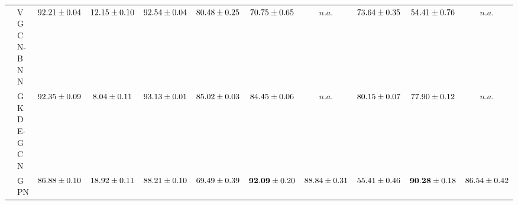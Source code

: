 \begin{table*}[!h]
{\begin{tabular}{ll|cc|cccc|ccc}
        & VGCN-BNN & ${92.21\tiny \pm 0.04}$ & ${12.15\tiny \pm 0.10}$ & ${92.54\tiny \pm 0.04}$ & ${80.48\tiny \pm 0.25}$ & ${70.75\tiny \pm 0.65}$ & $n.a.$ & ${73.64\tiny \pm 0.35}$ & ${54.41\tiny \pm 0.76}$ & $n.a.$\\
        & GKDE-GCN & ${92.35\tiny \pm 0.09}$ & ${8.04\tiny \pm 0.11}$ & ${93.13\tiny \pm 0.01}$ & ${85.02\tiny \pm 0.03}$ & ${84.45\tiny \pm 0.06}$ & $n.a.$ & ${80.15\tiny \pm 0.07}$ & ${77.90\tiny \pm 0.12}$ & $n.a.$\\
        & GPN & ${86.88\tiny \pm 0.10}$ & ${18.92\tiny \pm 0.11}$ & ${88.21\tiny \pm 0.10}$ & ${69.49\tiny \pm 0.39}$ & ${\mathbf{92.09}\tiny \pm 0.20}$ & ${{88.84}\tiny \pm 0.31}$ & ${55.41\tiny \pm 0.46}$ & ${\mathbf{90.28}\tiny \pm 0.18}$ & ${{86.54}\tiny \pm 0.42}$\\

        \midrule


\end{tabular}}
\end{table*}
